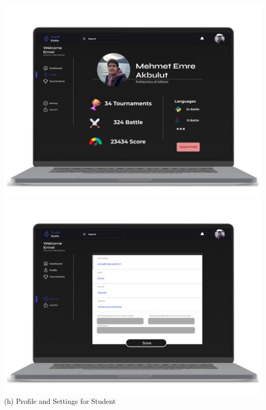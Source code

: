\begin{center}
\includegraphics[scale=0.13]{Images/ui-ux/student_profile.png}
\includegraphics[scale=0.13]{Images/ui-ux/student_settings.png}
        (h) Profile and Settings for Student
\end{center}
\newpage
